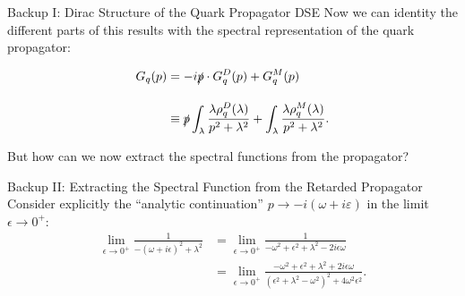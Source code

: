 \documentclass[10pt, aspectratio = 169]{beamer}
\begin{document}
\begin{frame}[noframenumbering]{Backup I: Dirac Structure of the Quark Propagator DSE}
Now we can identity the different parts of this results with the spectral representation of the quark propagator:

\begin{equation}
\begin{aligned}
	G_q(p) &=-i\slashed{p}\cdot G_q^D(p) + G_q^M(p)\\[1em]
	&\equiv \slashed{p} \int_\lambda\frac{\lambda\rho_q^{D}(\lambda)}{p^2+\lambda^2} + \int_\lambda\frac{\lambda\rho_q^M(\lambda)}{p^2+\lambda^2}.
	\end{aligned}\label{eqn:quark_prop_identification}
\end{equation}

\alert{But how can we now extract the spectral functions from the propagator?}
\end{frame}




\begin{frame}[noframenumbering]{Backup II: Extracting the Spectral Function from the Retarded Propagator}
Consider explicitly the \enquote{analytic continuation} $p\rightarrow -i\left(\omega + i\varepsilon\right)$ in the limit  $\epsilon\rightarrow 0^+$: 
\begin{equation}
	\begin{aligned}
		\lim\limits_{\epsilon\rightarrow 0^+} \frac{1}{-(\omega + i\epsilon)^2 + \lambda^2} &= 	\lim\limits_{\epsilon\rightarrow 0^+} \frac{1}{-\omega^2 + \epsilon^2 + \lambda^2 - 2i\epsilon\omega} \\
		&= 	\lim\limits_{\epsilon\rightarrow 0^+} \frac{-\omega^2 + \epsilon^2 + \lambda^2 + 2i\epsilon\omega}{(\epsilon^2 + \lambda^2 - \omega^2)^2 + 4\omega^2\epsilon^2}.
	\end{aligned}
	\end{equation}\end{frame}
\end{document}
